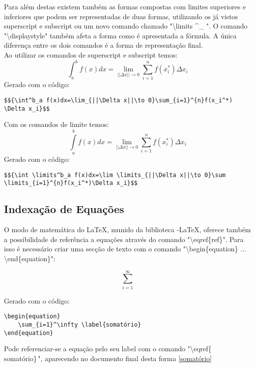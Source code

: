 Para além destas existem também as formas compostas com limites superiores e inferiores que podem ser representadas de duas formas, utilizando os já vistos superscript e subscript ou um novo comando chamado "\textbackslash limits \textasciicircum \_ ". O comando "\textbackslash displaystyle" também afeta a forma como é apresentada a fórmula. A única diferença entre os dois comandos é a forma de representação final.\\

Ao utilizar os comandos de superscript e subscript temos:
$${\int^b_a f(x) dx = \lim_{||\Delta x|| \to 0} \sum_{i=1}^{n} f(x_i^*)\Delta x_i}$$
Gerado com o código:
\begin{verbatim}$${\int^b_a f(x)dx=\lim_{||\Delta x||\to 0}\sum_{i=1}^{n}f(x_i^*)
\Delta x_i}$$
\end{verbatim}

Com os comandos de limite temos:
$${\int \limits^b_a f(x) dx = \lim \limits_{||\Delta x|| \to 0} \sum \limits_{i=1}^{n} f(x_i^*)\Delta x_i}$$
Gerado com o código:
\begin{verbatim}$${\int \limits^b_a f(x)dx=\lim \limits_{||\Delta x||\to 0}\sum
\limits_{i=1}^{n}f(x_i^*)\Delta x_i}$$
\end{verbatim}

\subsection{Indexação de Equações}
\label{subchap.indexmat}
O modo de matemática do \LaTeX , munido da biblioteca \AmS -\LaTeX , oferece também a possibilidade de referência a equações através do comando "\textbackslash eqref\{ref\}". Para isso é necessário criar uma secção de texto com o comando "\textbackslash begin\{equation\} ... \textbackslash end\{equation\}":

\begin{equation}
    \sum_{i=1}^\infty \label{somatório}
\end{equation}

Gerado com o código:
\begin{verbatim}
\begin{equation}
    \sum_{i=1}^\infty \label{somatório}
\end{equation}
\end{verbatim}

Pode referenciar-se a equação pelo seu label com o comando
"\textbackslash eqref\{ somatório\}\,", aparecendo no documento final desta forma  \eqref{somatório}

